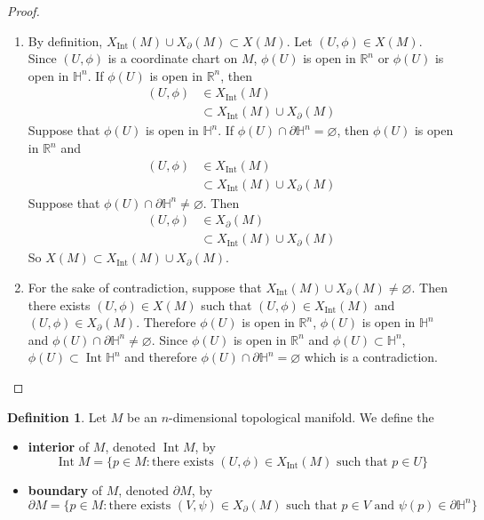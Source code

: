 \documentclass{book}
\theoremstyle{definition}
\newtheorem{defn}[definition]{Definition}
\renewcommand{\H}{\mathbb{H}}
\newcommand{\R}{\mathbb{R}}
\DeclareMathOperator{\Int}{Int}
\DeclareMathOperator*{\0}{\mbf{0}}
\DeclareMathOperator*{\1}{\mbf{1}}
\newcommand{\tbf}[1]{\textbf{#1}}
\newcommand{\p}{\partial}
\begin{document}
	\begin{proof}\
		\begin{enumerate}
			\item By definition, $X_{\Int}(M) \cup X_{\p}(M) \subset X(M)$. Let $(U, \phi) \in X(M)$. Since $(U, \phi)$ is a coordinate chart on $M$, $\phi(U)$ is open in $\R^n$ or $\phi(U)$ is open in $\H^n$. If $\phi(U)$ is open in $\R^n$, then 
			\begin{align*}
				(U, \phi) 
				& \in X_{\Int}(M) \\
				& \subset X_{\Int}(M) \cup X_{\p}(M)
			\end{align*}
			Suppose that $\phi(U)$ is open in $\H^n$. If $\phi(U) \cap \p \H^n = \varnothing$, then $\phi(U)$ is open in $\R^n$ and 
			\begin{align*}
				(U, \phi) 
				& \in X_{\Int}(M) \\
				& \subset X_{\Int}(M) \cup X_{\p}(M)
			\end{align*}
			Suppose that $\phi(U) \cap \p \H^n \neq \varnothing$. Then 
			\begin{align*}
				(U, \phi) 
				& \in X_{\p}(M) \\
				& \subset X_{\Int}(M) \cup X_{\p}(M)
			\end{align*}
			So $X(M) \subset X_{\Int}(M) \cup X_{\p}(M)$.
			\item For the sake of contradiction, suppose that $X_{\Int}(M) \cup X_{\p}(M) \neq \varnothing$. Then there exists $(U, \phi) \in X(M)$ such that $(U, \phi) \in X_{\Int}(M)$ and $(U, \phi) \in X_{\p}(M)$. Therefore $\phi(U)$ is open in $\R^n$, $\phi(U)$ is open in $\H^n$ and $\phi(U) \cap \p \H^n \neq \varnothing$. Since $\phi(U)$ is open in $\R^n$ and $\phi(U) \subset \H^n$, $\phi(U) \subset \Int \H^n$ and therefore $\phi(U) \cap \p \H^n = \varnothing$ which is a contradiction.
		\end{enumerate}
	\end{proof}

	\begin{defn} Let $M$ be an $n$-dimensional topological manifold. We define the
		\begin{itemize}
			\item \tbf{interior} of $M$, denoted $\Int M$, by 
			$$\Int M = \{p \in M: \text{there exists $(U, \phi) \in X_{\Int}(M)$ such that $p \in U$}\}$$
			\item \tbf{boundary} of $M$, denoted $\p M$, by 
			$$\p M = \{p \in M: \text{there exists $(V, \psi) \in X_{\p}(M)$ such that $p \in V$ and $\psi(p) \in \p \H^n$}\}$$
		\end{itemize}
	\end{defn}
\end{document}
